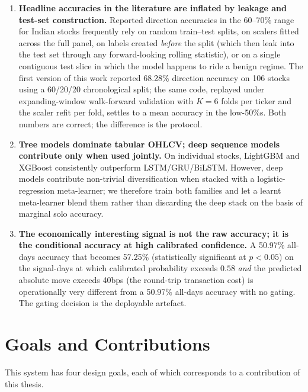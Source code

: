 \begin{enumerate}
    \item \textbf{Headline accuracies in the literature are inflated by leakage and test-set construction.} Reported direction accuracies in the 60--70\% range for Indian stocks frequently rely on random train--test splits, on scalers fitted across the full panel, on labels created \emph{before} the split (which then leak into the test set through any forward-looking rolling statistic), or on a single contiguous test slice in which the model happens to ride a benign regime. The first version of this work reported 68.28\% direction accuracy on 106 stocks using a 60/20/20 chronological split; the same code, replayed under expanding-window walk-forward validation with $K = 6$ folds per ticker and the scaler refit per fold, settles to a mean accuracy in the low-50\%s. Both numbers are correct; the difference is the protocol.
    \item \textbf{Tree models dominate tabular OHLCV; deep sequence models contribute only when used jointly.} On individual stocks, LightGBM and XGBoost consistently outperform LSTM/GRU/BiLSTM. However, deep models contribute non-trivial diversification when stacked with a logistic-regression meta-learner; we therefore train both families and let a learnt meta-learner blend them rather than discarding the deep stack on the basis of marginal solo accuracy.
    \item \textbf{The economically interesting signal is not the raw accuracy; it is the conditional accuracy at high calibrated confidence.} A 50.97\% all-days accuracy that becomes 57.25\% (statistically significant at $p<0.05$) on the signal-days at which calibrated probability exceeds $0.58$ \emph{and} the predicted absolute move exceeds 40bps (the round-trip transaction cost) is operationally very different from a 50.97\% all-days accuracy with no gating. The gating decision is the deployable artefact.
\end{enumerate}

\section{Goals and Contributions}

This system has four design goals, each of which corresponds to a contribution of this thesis.

